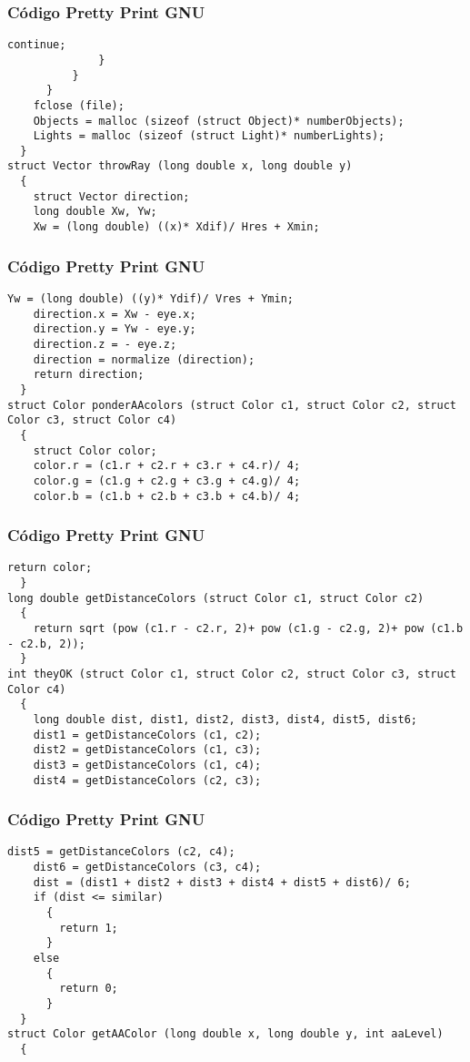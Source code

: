 \documentclass{beamer}
\begin{document}
\begin{frame}[fragile]
\frametitle{C\'odigo Pretty Print GNU}
\begin{lstlisting}[style=CStyle]
                continue;
              }
          }
      }
    fclose (file);
    Objects = malloc (sizeof (struct Object)* numberObjects);
    Lights = malloc (sizeof (struct Light)* numberLights);
  }
struct Vector throwRay (long double x, long double y)
  {
    struct Vector direction;
    long double Xw, Yw;
    Xw = (long double) ((x)* Xdif)/ Hres + Xmin;
\end{lstlisting}
\end{frame}
\begin{frame}[fragile]
\frametitle{C\'odigo Pretty Print GNU}
\begin{lstlisting}[style=CStyle]
    Yw = (long double) ((y)* Ydif)/ Vres + Ymin;
    direction.x = Xw - eye.x;
    direction.y = Yw - eye.y;
    direction.z = - eye.z;
    direction = normalize (direction);
    return direction;
  }
struct Color ponderAAcolors (struct Color c1, struct Color c2, struct Color c3, struct Color c4)
  {
    struct Color color;
    color.r = (c1.r + c2.r + c3.r + c4.r)/ 4;
    color.g = (c1.g + c2.g + c3.g + c4.g)/ 4;
    color.b = (c1.b + c2.b + c3.b + c4.b)/ 4;
\end{lstlisting}
\end{frame}
\begin{frame}[fragile]
\frametitle{C\'odigo Pretty Print GNU}
\begin{lstlisting}[style=CStyle]
    return color;
  }
long double getDistanceColors (struct Color c1, struct Color c2)
  {
    return sqrt (pow (c1.r - c2.r, 2)+ pow (c1.g - c2.g, 2)+ pow (c1.b - c2.b, 2));
  }
int theyOK (struct Color c1, struct Color c2, struct Color c3, struct Color c4)
  {
    long double dist, dist1, dist2, dist3, dist4, dist5, dist6;
    dist1 = getDistanceColors (c1, c2);
    dist2 = getDistanceColors (c1, c3);
    dist3 = getDistanceColors (c1, c4);
    dist4 = getDistanceColors (c2, c3);
\end{lstlisting}
\end{frame}
\begin{frame}[fragile]
\frametitle{C\'odigo Pretty Print GNU}
\begin{lstlisting}[style=CStyle]
    dist5 = getDistanceColors (c2, c4);
    dist6 = getDistanceColors (c3, c4);
    dist = (dist1 + dist2 + dist3 + dist4 + dist5 + dist6)/ 6;
    if (dist <= similar)
      {
        return 1;
      }
    else
      {
        return 0;
      }
  }
struct Color getAAColor (long double x, long double y, int aaLevel)
  {
    \end{lstlisting}
\end{frame}
\end{document}

